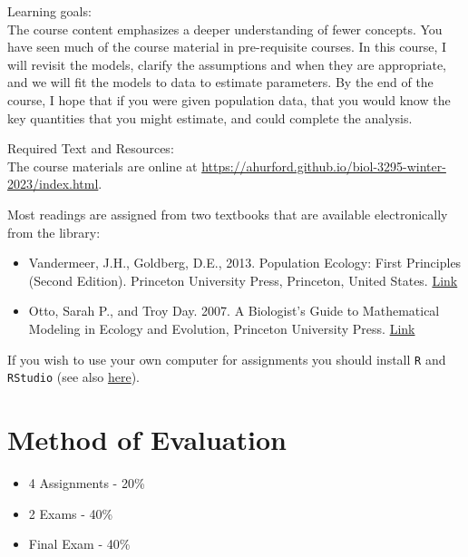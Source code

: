 \documentclass[
]{book}
\providecommand{\tightlist}{%
  \setlength{\itemsep}{0pt}\setlength{\parskip}{0pt}}
\begin{document}
Learning goals:\\
The course content emphasizes a deeper understanding of fewer concepts. You have seen much of the course material in pre-requisite courses. In this course, I will revisit the models, clarify the assumptions and when they are appropriate, and we will fit the models to data to estimate parameters. By the end of the course, I hope that if you were given population data, that you would know the key quantities that you might estimate, and could complete the analysis.

Required Text and Resources:\\
The course materials are online at \url{https://ahurford.github.io/biol-3295-winter-2023/index.html}.

Most readings are assigned from two textbooks that are available electronically from the library:

\begin{itemize}
\item
  Vandermeer, J.H., Goldberg, D.E., 2013. Population Ecology: First Principles (Second Edition). Princeton University Press, Princeton, United States. \href{https://ebookcentral-proquest-com.qe2a-proxy.mun.ca/lib/mun/detail.action?docID=1205619}{Link}
\item
  Otto, Sarah P., and Troy Day. 2007. A Biologist's Guide to Mathematical Modeling in Ecology and Evolution, Princeton University Press. \href{https://ebookcentral-proquest-com.qe2a-proxy.mun.ca/lib/mun/detail.action?docID=768551}{Link}
\end{itemize}

If you wish to use your own computer for assignments you should install \texttt{R} and \texttt{RStudio} (see also \href{https://ahurford.github.io/quant-guide-all-courses/install.html}{here}).

\hypertarget{method-of-evaluation}{%
\section{Method of Evaluation}\label{method-of-evaluation}}

\begin{itemize}
\tightlist
\item
  4 Assignments - 20\%\\
\item
  2 Exams - 40\%\\
\item
  Final Exam - 40\%\\
\end{itemize}
\end{document}
